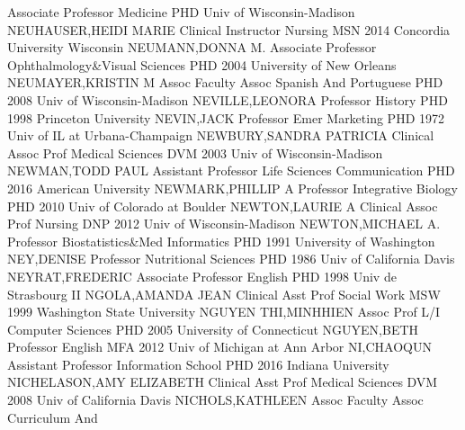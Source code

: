 \documentclass[
]{article}
\begin{document}
\textbar Associate Professor \textbar Medicine \textbar PHD Univ of
Wisconsin-Madison \textbar NEUHAUSER,HEIDI MARIE \textbar{} 
\textbar Clinical Instructor \textbar Nursing \textbar MSN 2014
Concordia University Wisconsin \textbar NEUMANN,DONNA M. \textbar{}
 \textbar Associate Professor \textbar Ophthalmology\&Visual
Sciences \textbar PHD 2004 University of New Orleans
\textbar NEUMAYER,KRISTIN M \textbar{}  \textbar Assoc
Faculty Assoc \textbar Spanish And Portuguese \textbar PHD 2008 Univ of
Wisconsin-Madison \textbar NEVILLE,LEONORA \textbar{} 
\textbar Professor \textbar History \textbar PHD 1998 Princeton
University \textbar NEVIN,JACK \textbar{} 
\textbar Professor Emer \textbar Marketing \textbar PHD 1972 Univ of IL
at Urbana-Champaign \textbar NEWBURY,SANDRA PATRICIA \textbar{}
 \textbar Clinical Assoc Prof \textbar Medical Sciences
\textbar DVM 2003 Univ of Wisconsin-Madison \textbar NEWMAN,TODD PAUL
\textbar{}  \textbar Assistant Professor \textbar Life
Sciences Communication \textbar PHD 2016 American University
\textbar NEWMARK,PHILLIP A \textbar{}  \textbar Professor
\textbar Integrative Biology \textbar PHD 2010 Univ of Colorado at
Boulder \textbar NEWTON,LAURIE A \textbar{} 
\textbar Clinical Assoc Prof \textbar Nursing \textbar DNP 2012 Univ of
Wisconsin-Madison \textbar NEWTON,MICHAEL A. \textbar{} 
\textbar Professor \textbar Biostatistics\&Med Informatics \textbar PHD
1991 University of Washington \textbar NEY,DENISE \textbar{}
 \textbar Professor \textbar Nutritional Sciences
\textbar PHD 1986 Univ of California Davis \textbar NEYRAT,FREDERIC
\textbar{}  \textbar Associate Professor \textbar English
\textbar PHD 1998 Univ de Strasbourg II \textbar NGOLA,AMANDA JEAN
\textbar{}  \textbar Clinical Asst Prof \textbar Social Work
\textbar MSW 1999 Washington State University \textbar NGUYEN
THI,MINHHIEN \textbar{}  \textbar Assoc Prof L/I
\textbar Computer Sciences \textbar PHD 2005 University of Connecticut
\textbar NGUYEN,BETH \textbar{}  \textbar Professor
\textbar English \textbar MFA 2012 Univ of Michigan at Ann Arbor
\textbar NI,CHAOQUN \textbar{}  \textbar Assistant Professor
\textbar Information School \textbar PHD 2016 Indiana University
\textbar NICHELASON,AMY ELIZABETH \textbar{} 
\textbar Clinical Asst Prof \textbar Medical Sciences \textbar DVM 2008
Univ of California Davis \textbar NICHOLS,KATHLEEN \textbar{}
 \textbar Assoc Faculty Assoc \textbar Curriculum And
\end{document}
